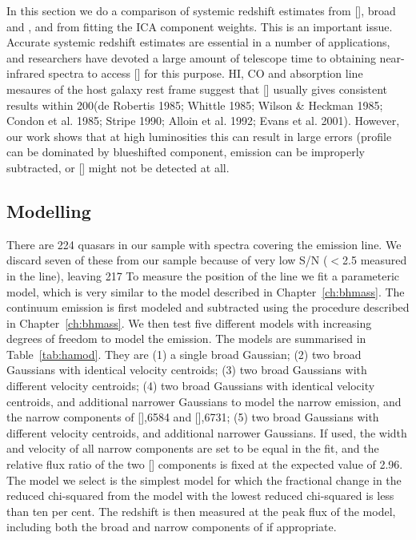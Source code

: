 In this section we do a comparison of systemic redshift estimates from [], broad \hb and \hans, and from fitting the \ac{ICA} component weights. 
This is an important issue. 
Accurate systemic redshift estimates are essential in a number of applications, and researchers have devoted a large amount of telescope time to obtaining near-infrared spectra to access [] for this purpose. 
HI, CO and absorption line mesaures of the host galaxy rest frame suggest that [] usually gives consistent results within 200\kms (de Robertis 1985; Whittle 1985; Wilson \& Heckman 1985; Condon et al. 1985; Stripe 1990; Alloin et al. 1992; Evans et al. 2001).  
However, our work shows that at high luminosities this can result in large errors (profile can be dominated by blueshifted component,  emission can be improperly subtracted, or [] might not be detected at all. 

\subsection{Modelling \hans}

There are 224 quasars in our sample with spectra covering the \ha emission line. 
We discard seven of these from our sample because of very low \ac{S/N} ($<$2.5 measured in the \ha line), leaving 217
To measure the position of the line we fit a parameteric model, which is very similar to the model described in Chapter~\ref{ch:bhmass}. 
The continuum emission is first modeled and subtracted using the procedure described in Chapter~\ref{ch:bhmass}. 
We then test five different models with increasing degrees of freedom to model the \ha emission. 
The models are summarised in Table~\ref{tab:hamod}. 
They are (1) a single broad Gaussian; (2) two broad Gaussians with identical velocity centroids; (3) two broad Gaussians with different velocity centroids; (4) two broad Gaussians with identical velocity centroids, and additional narrower Gaussians to model the narrow \ha emission, and the narrow components of [],6584 and [],6731; (5) two broad Gaussians with different velocity centroids, and additional narrower Gaussians. 
If used, the width and velocity of all narrow components are set to be equal in the fit, and the relative flux ratio of the two [] components is fixed at the expected value of 2.96.
The model we select is the simplest model for which the fractional change in the reduced chi-squared from the model with the lowest reduced chi-squared is less than ten per cent. 
The redshift is then measured at the peak flux of the \ha model, including both the broad and narrow components of \ha if appropriate. 

